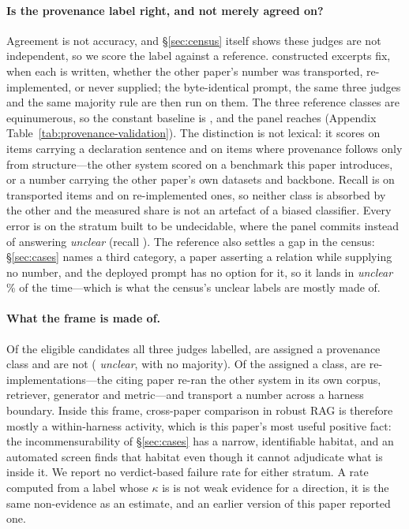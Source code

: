 \documentclass[11pt]{article}
\begin{document}
\paragraph{Is the provenance label right, and not merely agreed on?}
Agreement is not accuracy, and \S\ref{sec:census} itself shows these judges are
not independent, so we score the label against a reference. \PvItems{}
constructed excerpts fix, when each is written, whether the other paper's number
was transported, re-implemented, or never supplied; the byte-identical prompt,
the same three judges and the same majority rule are then run on them. The three
reference classes are equinumerous, so the constant baseline is \PvBase{}, and
the panel reaches \PvAcc{} \PvAccCI{} (Appendix
Table~\ref{tab:provenance-validation}). The distinction is not lexical: it
scores \PvExplicit{} on items carrying a declaration sentence and
\PvImplicit{} on items where provenance follows only from structure---the other
system scored on a benchmark this paper introduces, or a number carrying the
other paper's own datasets and backbone. Recall is \PvRecallTrans{} on
transported items and \PvRecallReimpl{} on re-implemented ones, so neither class
is absorbed by the other and the measured share is not an artefact of a biased
classifier. Every error is on the stratum built to be undecidable, where the
panel commits instead of answering \emph{unclear} (recall \PvRecallUnclear{}).
The reference also settles a gap in the census: \S\ref{sec:cases} names a third
category, a paper asserting a relation while supplying no number, and the
deployed prompt has no option for it, so it lands in \emph{unclear}
\PvAssertedUnclearPct\% of the time---which is what the census's
\ProvUnclear{} unclear labels are mostly made of.

\paragraph{What the frame is made of.}
Of the \ProvCoded{} eligible candidates all three judges labelled,
\ProvClassified{} are assigned a provenance class and \ProvUnclassified{} are
not (\ProvUnclear{} \emph{unclear}, \ProvNoMajority{} with no majority). Of the
\ProvClassified{} assigned a class, \ProvReimplemented{} are
re-implementations---the citing paper re-ran the other system in its own corpus,
retriever, generator and metric---and \ProvTransported{} transport a number
across a harness boundary. Inside this frame, cross-paper comparison in robust
RAG is therefore mostly a within-harness activity, which is this paper's most
useful positive fact: the incommensurability of \S\ref{sec:cases} has a narrow,
identifiable habitat, and an automated screen finds that habitat even though it
cannot adjudicate what is inside it. We report no verdict-based failure rate for
either stratum. A rate computed from a label whose $\kappa$ is \DecVerdictK{} is
not weak evidence for a direction, it is the same non-evidence as an estimate,
and an earlier version of this paper reported one.
\end{document}
